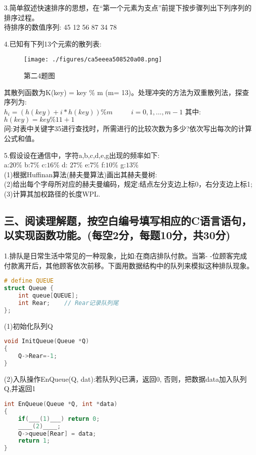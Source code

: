 3.简单叙述快速排序的思想，在“第一个元素为支点”前提下按步骤列出下列序列的排序过程。 \\
待排序的数值序列: 45 12 56 87 34 78

4.已知有下列13个元索的散列表:
\begin{figure}[ht]
\centering
\texttt{[image: ./figures/ca5eeea508520a08.png]}
\caption{第二4题图} \label{fig_SYDS12_3}
\end{figure}
其散列函数为K(key) = key \% m (m= 13)。处理冲突的方法为双重散列法，探查序列为:  \\
$h_i=(h(key)+i*h(key))\%m$ $\qquad$ $i=0,1,...,m-1$  其中: $h(key)=key\%11+1$ \\
问:对表中关键字35进行查找时，所需进行的比较次数为多少?依次写出每次的计算公式和值。

5.假设设在通信中，字符a,b,c,d,e,g出现的频率如下: \\
a:$20\%$ b:$7\%$ c:$16\%$ d: $27\%$ e:$7\%$ f:$10\%$ g:$13\%$ \\
(1)根据Huffinan算法(赫夫曼算法)画出其赫夫曼树: \\
(2)给出每个字母所对应的赫夫曼编码，规定:结点左分支边上标0，右分支边上标1; \\
(3)计算其加权路径的长度WPL.

\subsection{三、阅读理解题，按空白编号填写相应的C语言语句，以实现函数功能。(每空2分，每题10分，共30分)}

1.排队是日常生活中常见的一种现象，比如:在商店排队付款。当第- -位顾客完成付款离开后，其他顾客依次前移。下面用数据结构中的队列来模拟这种排队现象。 \\
\begin{lstlisting}[language=cpp]
# define QUEUE
struct Queue {
    int queue[QUEUE];
    int Rear;    // Rear记录队列尾
};
\end{lstlisting}
(1)初始化队列Q
\begin{lstlisting}[language=cpp]
void InitQueue(Queue *Q)
{
    Q->Rear=-1;
}
\end{lstlisting}

(2)入队操作EnQueue(Q, dat):若队列Q已满，返回0, 否则，把数据data加入队列Q,并返回1
\begin{lstlisting}[language=cpp]
int EnQueue(Queue *Q, int *data)
{
    if(___(1)___) return 0;
    ____(2)____;
    Q->queue[Rear] = data;
    return 1;
}
\end{lstlisting}

